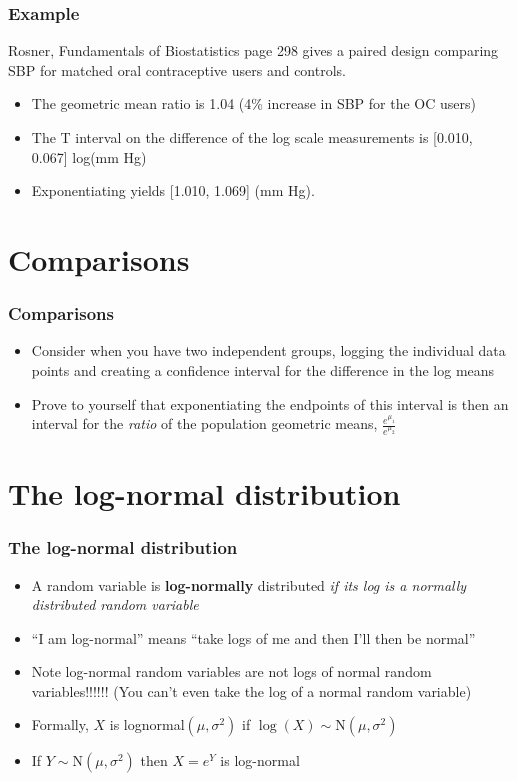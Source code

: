 \documentclass[aspectratio=169]{beamer}
\begin{document}
\begin{frame}\frametitle{Example}
Rosner, Fundamentals of Biostatistics page 298 gives a paired design comparing SBP for matched oral contraceptive users and controls.
\begin{itemize}
\item The geometric mean ratio is 1.04 (4\% increase in SBP for the OC users)
\item The T interval on the difference of the log scale measurements is [0.010, 0.067] log(mm Hg)
\item Exponentiating yields [1.010, 1.069] (mm Hg). 
\end{itemize}


\end{frame}

\section{Comparisons}
\begin{frame}\frametitle{Comparisons}
\begin{itemize}
\item Consider when you have two independent groups, logging the
  individual data points and creating a confidence interval for the
  difference in the log means
\item Prove to yourself that exponentiating the endpoints of this
  interval is then an interval for the {\em ratio} of the population
  geometric means, $\frac{e^{\mu_1}}{e^{\mu_2}}$
\end{itemize}
\end{frame}

\section{The log-normal distribution}
\begin{frame}\frametitle{The log-normal distribution}
\begin{itemize}
\item A random variable is {\bf log-normally} distributed {\em if its log
    is a normally distributed random variable}
\item ``I am log-normal'' means ``take logs of me and then I'll then be normal''
\item Note log-normal random variables are not logs of normal random variables!!!!!! (You can't even take the log of a normal random variable)
\item Formally, $X$ is lognormal$(\mu,\sigma^2)$ if $\log(X) \sim \mbox{N}(\mu, \sigma^2)$
\item If $Y \sim \mbox{N}(\mu,\sigma^2)$ then $X = e^Y$ is log-normal
\end{itemize}
\end{frame} 
\end{document}
